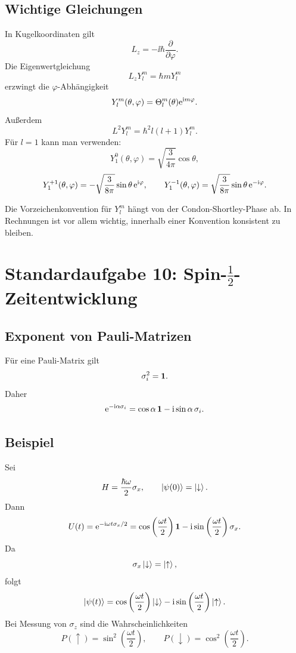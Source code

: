 \subsection{Wichtige Gleichungen}

In Kugelkoordinaten gilt
\[
    L_z=-\ii\hbar\frac{\partial}{\partial\varphi}.
\]
Die Eigenwertgleichung
\[
    L_zY_l^m=\hbar mY_l^m
\]
erzwingt die $\varphi$-Abhängigkeit
\[
    Y_l^m(\theta,\varphi)=\Theta_l^m(\theta)\mathrm{e}^{\mathrm{i} m\varphi}.
\]
Außerdem
\[
    L^2Y_l^m=\hbar^2l(l+1)Y_l^m.
\]
Für $l=1$ kann man verwenden:
\[
    Y_1^0(\theta,\varphi)=\sqrt{\frac{3}{4\pi}}\cos\theta,
\]
\[
    Y_1^{+1}(\theta,\varphi)=-\sqrt{\frac{3}{8\pi}}\sin\theta\,\mathrm{e}^{\mathrm{i}\varphi},
    \qquad
    Y_1^{-1}(\theta,\varphi)=\sqrt{\frac{3}{8\pi}}\sin\theta\,\mathrm{e}^{-\mathrm{i}\varphi}.
\]

\begin{examtipbox}
Die Vorzeichenkonvention für $Y_l^m$ hängt von der Condon-Shortley-Phase ab. In Rechnungen ist vor allem wichtig, innerhalb einer Konvention konsistent zu bleiben.
\end{examtipbox}

\section{Standardaufgabe 10: Spin-$\frac12$-Zeitentwicklung}

\subsection{Exponent von Pauli-Matrizen}

Für eine Pauli-Matrix gilt
\[
    \sigma_i^2=\mathbf{1}.
\]
Daher
\[
    \mathrm{e}^{-\mathrm{i}\alpha\sigma_i}
    =\cos\alpha\,\mathbf{1}-\mathrm{i}\sin\alpha\,\sigma_i.
\]

\subsection{Beispiel}

Sei
\[
    H=\frac{\hbar\omega}{2}\sigma_x,
    \qquad
    \left|\psi(0)\right\rangle=\left|\downarrow\right\rangle.
\]
Dann
\[
    U(t)=\mathrm{e}^{-\mathrm{i}\omega t\sigma_x/2}
    =\cos\left(\frac{\omega t}{2}\right)\mathbf{1}
    -\mathrm{i}\sin\left(\frac{\omega t}{2}\right)\sigma_x.
\]
Da
\[
    \sigma_x\left|\downarrow\right\rangle=\left|\uparrow\right\rangle,
\]
folgt
\[
    \left|\psi(t)\right\rangle=
    \cos\left(\frac{\omega t}{2}\right)\left|\downarrow\right\rangle
    -\mathrm{i}\sin\left(\frac{\omega t}{2}\right)\left|\uparrow\right\rangle.
\]
Bei Messung von $\sigma_z$ sind die Wahrscheinlichkeiten
\[
    P(\uparrow)=\sin^2\left(\frac{\omega t}{2}\right),
    \qquad
    P(\downarrow)=\cos^2\left(\frac{\omega t}{2}\right).
\]


